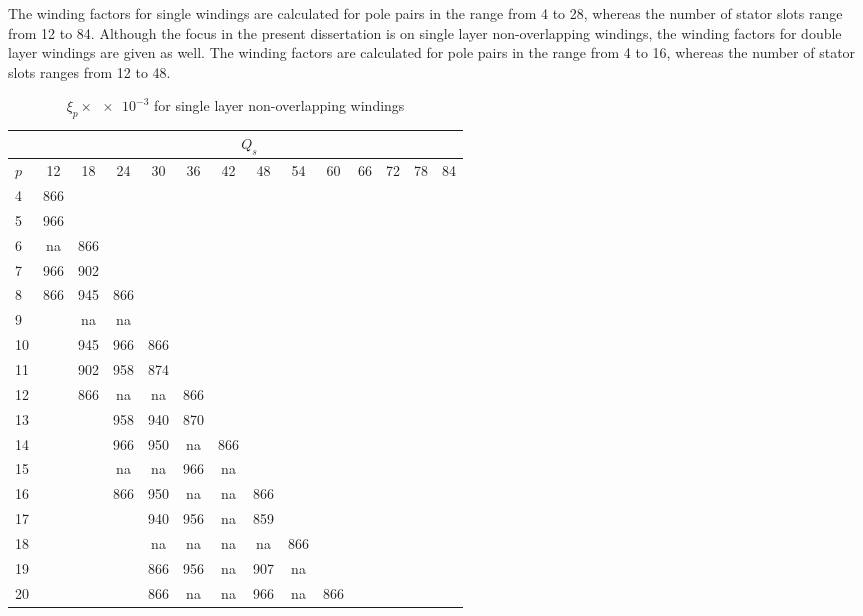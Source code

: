 The winding factors for single windings are calculated for pole pairs in the range from 4 to 28, whereas the number of stator slots range from 12 to 84. Although the focus in the present dissertation is on single layer non-overlapping windings, the winding factors for double layer windings are given as well. The winding factors are calculated for pole pairs in the range from 4 to 16, whereas the number of stator slots ranges from 12 to 48.
\begin{table}[htbp]
  \caption{$\xi_p \times \num{e-3}$ for single layer non-overlapping windings}
  \label{tab:xi_single}
  \centering
   \begin{tabular}
  	{|l||c|c|c|c|c|c|c|c|c|c|c|c|c|}\cline{2-14}
  	\multicolumn{1}{c}{}& \multicolumn{13}{|c|}{$Q_s$}
  	\\\hline
  	$p$&12 &18 &24 &30 &36 &42 &48 &54 &60 &66 &72 &78 &84  \\\hline
  	4  &866&   &   &   &   &   &   &   &   &   &   &   &    \\
  	5  &966&   &   &   &   &   &   &   &   &   &   &   &    \\
  	6  &na &866&   &   &   &   &   &   &   &   &   &   &    \\
  	7  &966&902&   &   &   &   &   &   &   &   &   &   &    \\
  	8  &866&945&866&   &   &   &   &   &   &   &   &   &    \\
  	9  &   &na &na &   &   &   &   &   &   &   &   &   &    \\
  	10 &   &945&966&866&   &   &   &   &   &   &   &   &    \\
  	11 &   &902&958&874&   &   &   &   &   &   &   &   &    \\
  	12 &   &866&na &na &866&   &   &   &   &   &   &   &    \\
  	13 &   &   &958&940&870&   &   &   &   &   &   &   &    \\
  	14 &   &   &966&950&na &866&   &   &   &   &   &   &    \\
  	15 &   &   &na &na &966&na &   &   &   &   &   &   &    \\
  	16 &   &   &866&950&na &na &866&   &   &   &   &   &    \\
  	17 &   &   &   &940&956&na &859&   &   &   &   &   &    \\
  	18 &   &   &   &na &na &na &na &866&   &   &   &   &    \\
  	19 &   &   &   &866&956&na &907&na &   &   &   &   &    \\
  	20 &   &   &   &866&na &na &966&na &866&   &   &   &    \\

\end{tabular}
\end{table}
